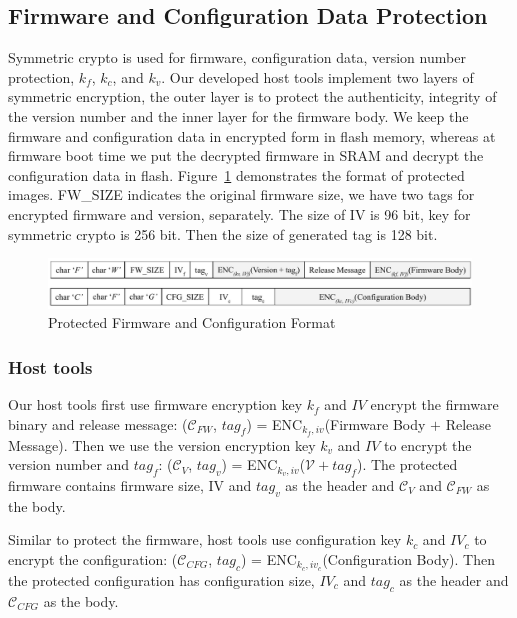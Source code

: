 \documentclass[11pt,oneside,onecolumn,letterpaper]{article}
\begin{document}
\subsection{Firmware and Configuration Data Protection}
Symmetric crypto is used for firmware, configuration data, version number protection, $k_f$, $k_c$, and $k_v$.
Our developed host tools implement two layers of symmetric encryption, the outer layer is to protect the authenticity, integrity of the version number and the inner layer for the firmware body.
We keep the firmware and configuration data in encrypted form in flash memory, whereas at firmware boot time we put the decrypted firmware in SRAM and decrypt the configuration data in flash.
Figure~\ref{fig:frmt} demonstrates the format of protected images.
FW\_SIZE indicates the original firmware size, we have two tags for encrypted firmware and version, separately.
The size of IV is 96 bit, key for symmetric crypto is 256 bit.
Then the size of generated tag is 128 bit.

\begin{figure}[!htbp]
	\begin{centering}
		\includegraphics[width = .98\textwidth]{pic/FW_CFG_FORMAT.pdf}
		\caption{Protected Firmware and Configuration Format}
		\label{fig:frmt}
	\end{centering}
\end{figure}

\subsubsection{Host tools}
Our host tools first use firmware encryption key $k_f$ and $IV$ encrypt the firmware binary and release message: ($\mathcal{C}_{FW}$, $tag_f$) = ENC$_{k_f, iv}$(Firmware Body $+$ Release Message).
Then we use the version encryption key $k_v$ and $IV$ to encrypt the version number and $tag_f$: ($\mathcal{C}_V$, $tag_v$) = ENC$_{k_v, iv}$($\mathcal{V} + tag_f$).
The protected firmware contains firmware size, IV and $tag_v$ as the header and $\mathcal{C}_V$ and $\mathcal{C}_{FW}$ as the body.

Similar to protect the firmware, host tools use configuration key $k_c$ and $IV_c$ to encrypt the configuration: ($\mathcal{C}_{CFG}$, $tag_c$) = ENC$_{k_c, iv_c}$(Configuration Body).
Then the protected configuration has configuration size, $IV_c$ and $tag_c$ as the header and $\mathcal{C}_{CFG}$ as the body.
\end{document}
